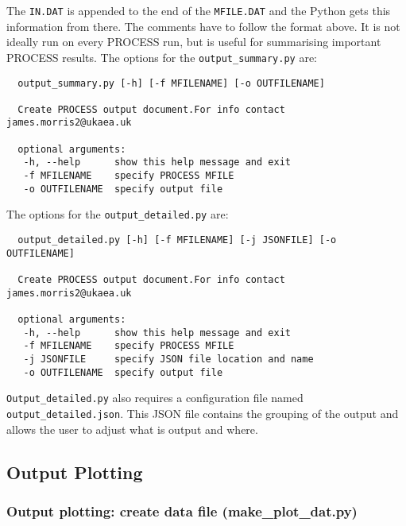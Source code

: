 \documentclass[11pt,a4paper]{article}
\begin{document}
The \texttt{IN.DAT} is appended to the end of the \texttt{MFILE.DAT} and the Python gets this 
information from there. The comments have to follow the format above. It is not ideally run on 
every PROCESS run, but is useful for summarising important PROCESS results. The options for 
the \texttt{output\_summary.py} are:\\

\begin{mdframed}
 \begin{verbatim}
  output_summary.py [-h] [-f MFILENAME] [-o OUTFILENAME]

  Create PROCESS output document.For info contact james.morris2@ukaea.uk

  optional arguments:
   -h, --help      show this help message and exit
   -f MFILENAME    specify PROCESS MFILE
   -o OUTFILENAME  specify output file
 \end{verbatim}
\end{mdframed}

The options for the \texttt{output\_detailed.py} are:\\

\begin{mdframed}
 \begin{verbatim}
  output_detailed.py [-h] [-f MFILENAME] [-j JSONFILE] [-o OUTFILENAME]

  Create PROCESS output document.For info contact james.morris2@ukaea.uk

  optional arguments:
   -h, --help      show this help message and exit
   -f MFILENAME    specify PROCESS MFILE
   -j JSONFILE     specify JSON file location and name
   -o OUTFILENAME  specify output file
 \end{verbatim}
\end{mdframed}

\texttt{Output\_detailed.py} also requires a configuration file named 
\texttt{output\_detailed.json}. This JSON file contains the grouping of the output 
and allows the user to adjust what is output and where.

\subsection{Output Plotting}


\subsubsection{Output plotting: create data file (make\_plot\_dat.py)}
\end{document}
